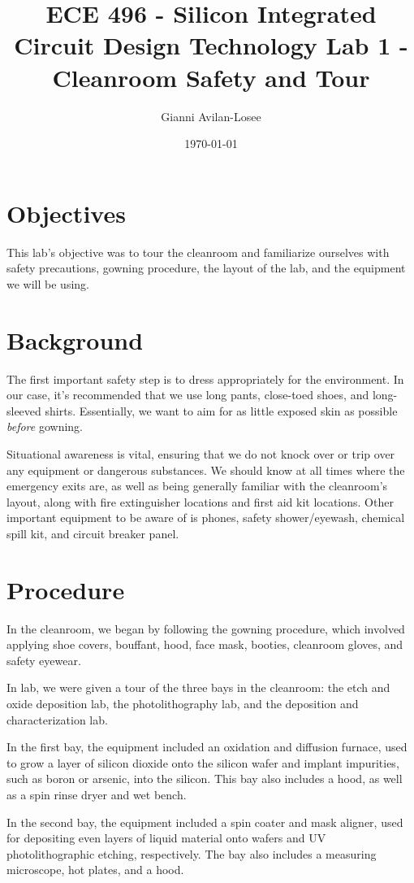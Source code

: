 \documentclass[12pt]{article}
\title{ECE 496 - Silicon Integrated Circuit Design Technology  Lab 1 - Cleanroom Safety and Tour}
\author{Gianni Avilan-Losee}
\date{\today}
\begin{document}
\maketitle
\section{Objectives}

This lab's objective was to tour the cleanroom and familiarize ourselves with safety precautions, gowning procedure, the layout of the lab, and the equipment we will be using.

\section{Background}
The first important safety step is to dress appropriately for the environment. In our case, it's recommended that we use long pants, close-toed shoes, and long-sleeved shirts. Essentially, we want to aim for as little exposed skin as possible \textit{before} gowning. 

Situational awareness is vital, ensuring that we do not knock over or trip over any equipment or dangerous substances. We should know at all times where the emergency exits are, as well as being generally familiar with the cleanroom's layout, along with fire extinguisher locations and first aid kit locations. Other important equipment to be aware of is phones, safety shower/eyewash, chemical spill kit, and circuit breaker panel.

\section{Procedure}
In the cleanroom, we began by following the gowning procedure, which involved applying shoe covers, bouffant, hood, face mask, booties, cleanroom gloves, and safety eyewear.

In lab, we were given a tour of the three bays in the cleanroom: the etch and oxide deposition lab, the photolithography lab, and the deposition and characterization lab. 

In the first bay, the equipment included an oxidation and diffusion furnace, used to grow a layer of silicon dioxide onto the silicon wafer and implant impurities, such as boron or arsenic, into the silicon. This bay also includes a hood, as well as a spin rinse dryer and wet bench.  

In the second bay, the equipment included a spin coater and mask aligner, used for depositing even layers of liquid material onto wafers and UV photolithographic etching, respectively. The bay also includes a measuring microscope, hot plates, and a hood. 
\end{document}
